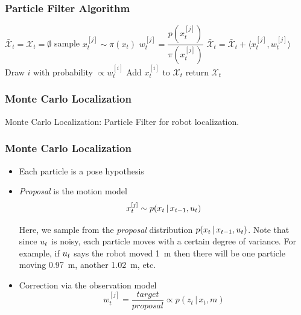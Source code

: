 \begin{frame}
    \frametitle{Particle Filter Algorithm}

    \begin{algorithmic}[1]
    \State $\bar{\mathcal{X}}_t = \mathcal{X}_t = \emptyset$
        \State sample $x_t^{[j]} \sim \pi(x_t)$
        \State $w_t^{[j]} = \dfrac{p(x_t^{[j]})}{\pi(x_t^{[j]})}$
        \State $\bar{\mathcal{X}}_t = \bar{\mathcal{X}}_t + \langle x_t^{[j]}, w_t^{[j]}\rangle$
    \EndFor
        \State Draw $i$ with probability $\propto w_t^{[i]}$
        \State Add $x_t^{[i]}$ to $\mathcal{X}_t$
    \EndFor
    \State return $\mathcal{X}_t$
    \EndProcedure
    \end{algorithmic}
\end{frame}

\begin{frame}
    \frametitle{Monte Carlo Localization}

    Monte Carlo Localization: Particle Filter for robot localization.
\end{frame}

\begin{frame}
    \frametitle{Monte Carlo Localization}
    
    \begin{itemize}
        \item Each particle is a pose hypothesis
        \item \emph{Proposal} is the motion model
            \begin{equation*}
                x_t^{[j]} \sim p(x_{t} \, | \, x_{t-1}, u_{t})
            \end{equation*}
        
            Here, we sample from the \emph{proposal} distribution $p(x_{t} \, | \, x_{t-1}, u_{t})$. Note that since $u_{t}$ is noisy, each particle moves with a certain degree of variance. For example, if $u_{t}$ says the robot moved \SI{1}{\meter} then there will be one particle moving \SI{0.97}{\meter}, another \SI{1.02}{\meter}, etc.
        
        \item Correction via the observation model
            \begin{equation*}
                w_t^{[j]} = \frac{target}{proposal} \propto p(z_t \, | \, x_t, m)
            \end{equation*}
    \end{itemize}
\end{frame}

